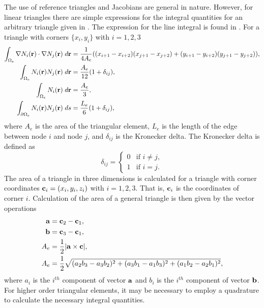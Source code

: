       The use of reference triangles and Jacobians are general in nature.
      However, for linear triangles there are simple expressions
      for the integral quantities for an arbitrary triangle given in 
      \cite{textbookwhite}. The expression for
      the line integral is found in \cite{computerLab}. For a triangle with 
      corners $\{ x_i,y_i \}$ with $i=1,2,3$
      \begin{align}
        \int_{\Omega_e} \mathbf{\nabla} N_i(\mathbf{r}) \cdot \mathbf{\nabla} N_j(\mathbf{r}) 
          \;d\mathbf{r} &= \frac{1}{4 A_e}
          ((x_{i+1}-x_{i+2})(x_{j+1}-x_{j+2}) + 
          (y_{i+1}-y_{i+2})(y_{j+1}-y_{j+2})), \\
        \int_{\Omega_e} N_i(\mathbf{r}) N_j(\mathbf{r}) \;d\mathbf{r} &= 
          \frac{A_e}{12} (1+\delta_{ij}), \\
        \int_{\Omega_e} N_i(\mathbf{r}) \;d\mathbf{r} &= \frac{A_e}{3}, \\
        \int_{\partial \Omega_e} N_i(\mathbf{r}) N_j(\mathbf{r}) \;ds &=
          \frac{L_e}{6}(1+\delta_{ij}), 
      \end{align}
      where $A_e$ is the area of the triangular element, $L_e$ is the length of 
      the edge between node $i$ and node $j$, and $\delta_{ij}$ is the Kronecker
      delta.
      The Kronecker delta is defined as
      \begin{equation} \label{eq:kroneker_delta}
        \delta_{ij} =
        \begin{cases}
          0 & \text{if } i \ne j, \\
          1 & \text{if } i = j.
        \end{cases}
      \end{equation}
      The area of a triangle in three dimensions is calculated for a triangle
      with corner coordinates $\mathbf{c}_i = (x_i, y_i, z_i)$ with $i=1,2,3$.
      That is, $\mathbf{c}_i$ is the coordinates of corner $i$. Calculation of the area
      of a general triangle is then given by the vector operations
      \begin{align}
        \mathbf{a} &= \mathbf{c}_2 - \mathbf{c}_1, \\
        \mathbf{b} &= \mathbf{c}_3 - \mathbf{c}_1, \\
        A_e &= \frac{1}{2} \lvert \mathbf{a} \times \mathbf{c} \rvert, \\
        \label{eq:area_triangle}
        A_e &= \frac{1}{2} \sqrt{ (a_2 b_3 - a_3 b_2)^2 + (a_3 b_1 - a_1 b_3)^2 +
          (a_1 b_2 - a_2 b_1)^2},
      \end{align}
      where $a_i$ is the $i^{th}$ component of vector $\mathbf{a}$ and $b_i$ is the
      $i^{th}$ component of vector $\mathbf{b}$.
      For higher order triangular elements, it may be necessary to employ a 
      quadrature to calculate the necessary integral quantities.

